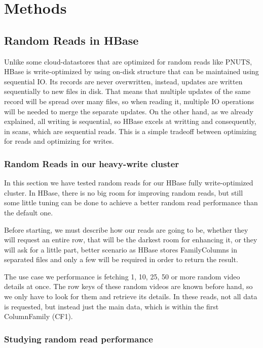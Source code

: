 \chapter{Methods}
\label{chapter:methods II}
 
\section{Random Reads in HBase}

Unlike some cloud-datastores that are optimized for random reads like PNUTS, HBase is write-optimized by using on-disk structure that can be maintained using sequential IO. Its records are never overwritten, instead, updates are written sequentially to new files in disk. That means that multiple updates of the same record will be spread over many files, so when reading it, multiple IO operations will be needed to merge the separate updates. On the other hand, as we already explained, all writing is sequential, so HBase excels at writting and consequently, in scans, which are sequential reads. This is a simple tradeoff between optimizing for reads and optimizing for writes.

\subsection{Random Reads in our heavy-write cluster}

In this section we have tested random reads for our HBase fully write-optimized cluster. In HBase, there is no big room for improving random reads, but still some little tuning can be done to achieve a better random read performance than the default one.
\par
Before starting, we must describe how our reads are going to be, whether they will request an entire row, that will be the darkest room for enhancing it, or they will ask for a little part, better scenario as HBase stores FamilyColumns in separated files and only a few will be required in order to return the result. 
\par
The use case we performance is fetching 1, 10, 25, 50 or more random video details at once. The row keys of these random videos are known before hand, so we only have to look for them and retrieve its details. In these reads, not all data is requested, but instead just the main data, which is within the first ColumnFamily (CF1).                  

\subsection{Studying random read performance}

